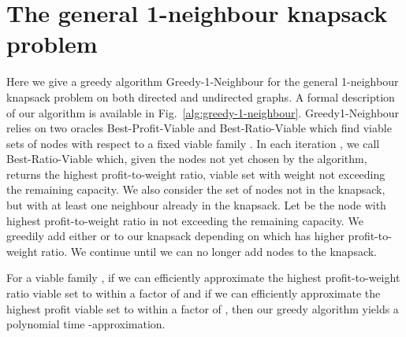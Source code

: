 \documentclass[12pt]{article}
\begin{document}
\section{The general 1-neighbour knapsack problem} \label{sec:g1n}


Here we give a greedy algorithm {\sc Greedy-1-Neighbour} for the general 1-neighbour knapsack problem on both directed and undirected graphs.  A formal description of our algorithm is available in Fig.~\ref{alg:greedy-1-neighbour}.  {\sc Greedy1-Neighbour} relies on two oracles {\sc Best-Profit-Viable} and {\sc Best-Ratio-Viable} which find viable sets of nodes with respect to a fixed viable family .  In each iteration , we call {\sc Best-Ratio-Viable} which, given the nodes not yet chosen by the algorithm, returns the highest profit-to-weight ratio, viable set  with weight not exceeding the remaining capacity.  We also consider the set of nodes  not in the knapsack, but with at least one neighbour already in the knapsack.  Let  be the node with highest profit-to-weight ratio in  not exceeding the remaining capacity.  We greedily add either  or  to our knapsack  depending on which has higher profit-to-weight ratio. We continue until we can no longer add nodes to the knapsack.

For a viable family , if we can efficiently approximate the highest profit-to-weight ratio viable set to within a factor of  and if we can efficiently approximate the highest profit viable set to within a factor of , then our greedy algorithm yields a polynomial time -approximation.
\end{document}
